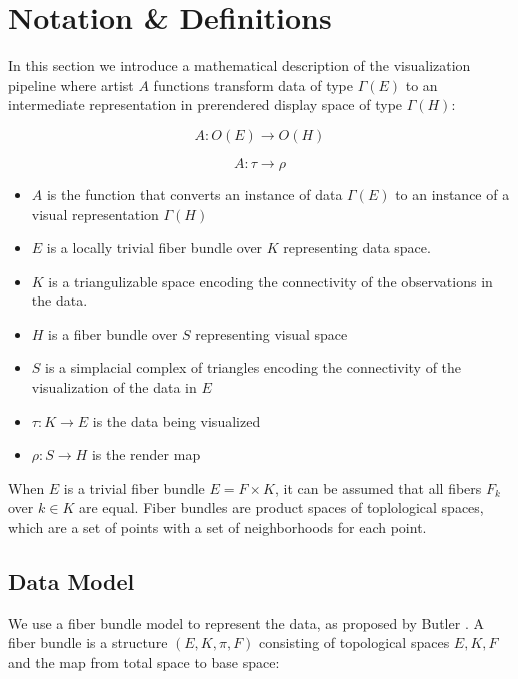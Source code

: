 \documentclass[../main.tex]{subfiles}
\begin{document}
\section{Notation \& Definitions}
In this section we introduce a mathematical description of the visualization pipeline where artist $A$ functions transform data of type $\Gamma(E)$ to an intermediate representation in prerendered display space of type $\Gamma(H)$:

\begin{equation}
    A: O(E) \rightarrow O(H)
    \label{eq:artist}
\end{equation}

\begin{equation}
    A: \tau \rightarrow \rho
\end{equation}

\begin{itemize}
\item $A$ is the function that converts an instance of data $\Gamma(E)$ to an instance of a visual representation $\Gamma(H)$ 
\item $E$ is a locally trivial fiber bundle over $K$ representing data space.
\item $K$ is a triangulizable space encoding the connectivity of the observations in the data. 
\item $H$ is a fiber bundle over $S$ representing visual space
\item $S$ is a simplacial complex of triangles encoding the connectivity of the visualization of the data in $E$
\item $\tau: K\rightarrow E$ is the data being visualized
\item $\rho: S \rightarrow H$ is the render map
\end{itemize}

When $E$ is a trivial fiber bundle $E = F \times K$, it can be assumed that all fibers $F_{k}$ over $k \in K$ are equal. Fiber bundles are product spaces of toplological spaces, which are a set of points with a set of neighborhoods for each point\cite{FiberBundle2020, rowlandFiberBundle}.

\subsection{Data Model}

We use a fiber bundle model to represent the data, as proposed by Butler 
\cite{butlerVectorBundleClassesForm1992,butlerVisualizationModelBased1989}. A fiber bundle is a structure $(E, K, \pi, F)$  consisting of topological spaces $E, K, F$ and the map from total space to base space:
\end{document}
